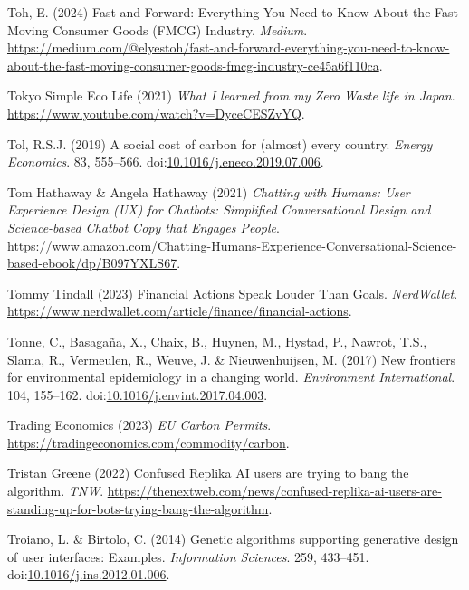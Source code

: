 \documentclass[
  letterpaper,
  DIV=11,
  numbers=noendperiod]{scrartcl}
\newlength{\cslhangindent}
\newenvironment{CSLReferences}[2] %
 {\begin{list}{}{%
  \setlength{\itemindent}{0pt}
  \setlength{\leftmargin}{0pt}
  \setlength{\parsep}{0pt}
  \ifodd #1
   \setlength{\leftmargin}{\cslhangindent}
   \setlength{\itemindent}{-1\cslhangindent}
  \fi
  \setlength{\itemsep}{#2\baselineskip}}}
 {\end{list}}
\begin{document}
\begin{CSLReferences}{0}{1}
Toh, E. (2024) Fast and {Forward}: {Everything You Need} to {Know About}
the {Fast-Moving Consumer Goods} ({FMCG}) {Industry}. \emph{Medium}.
\url{https://medium.com/@elyestoh/fast-and-forward-everything-you-need-to-know-about-the-fast-moving-consumer-goods-fmcg-industry-ce45a6f110ca}.

Tokyo Simple Eco Life (2021) \emph{What {I} learned from my {Zero Waste}
life in {Japan}}. \url{https://www.youtube.com/watch?v=DyceCESZvYQ}.

Tol, R.S.J. (2019) A social cost of carbon for (almost) every country.
\emph{Energy Economics}. 83, 555--566.
doi:\href{https://doi.org/10.1016/j.eneco.2019.07.006}{10.1016/j.eneco.2019.07.006}.

Tom Hathaway \& Angela Hathaway (2021) \emph{Chatting with {Humans}:
{User Experience Design} ({UX}) for {Chatbots}: {Simplified
Conversational Design} and {Science-based Chatbot Copy} that {Engages
People}}.
\url{https://www.amazon.com/Chatting-Humans-Experience-Conversational-Science-based-ebook/dp/B097YXLS67}.

Tommy Tindall (2023) Financial {Actions Speak Louder Than Goals}.
\emph{NerdWallet}.
\url{https://www.nerdwallet.com/article/finance/financial-actions}.

Tonne, C., Basagaña, X., Chaix, B., Huynen, M., Hystad, P., Nawrot,
T.S., Slama, R., Vermeulen, R., Weuve, J. \& Nieuwenhuijsen, M. (2017)
New frontiers for environmental epidemiology in a changing world.
\emph{Environment International}. 104, 155--162.
doi:\href{https://doi.org/10.1016/j.envint.2017.04.003}{10.1016/j.envint.2017.04.003}.

Trading Economics (2023) \emph{{EU Carbon Permits}}.
\url{https://tradingeconomics.com/commodity/carbon}.

Tristan Greene (2022) Confused {Replika AI} users are trying to bang the
algorithm. \emph{TNW}.
\url{https://thenextweb.com/news/confused-replika-ai-users-are-standing-up-for-bots-trying-bang-the-algorithm}.

Troiano, L. \& Birtolo, C. (2014) Genetic algorithms supporting
generative design of user interfaces: {Examples}. \emph{Information
Sciences}. 259, 433--451.
doi:\href{https://doi.org/10.1016/j.ins.2012.01.006}{10.1016/j.ins.2012.01.006}.


\end{CSLReferences}
\end{document}
